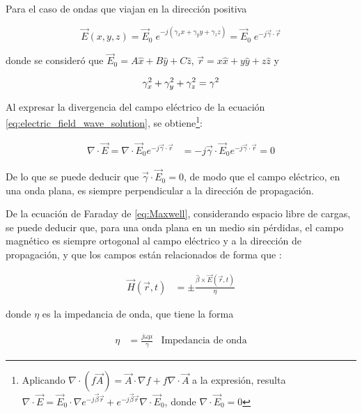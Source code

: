 Para el caso de ondas que viajan en la dirección positiva

\begin{equation}
	\label{eq:electric_field_wave_solution}
	\vec{E}(x,y,z) = \vec{E}_0 \;e^{-j(\gamma_x x + \gamma_y y + \gamma_z z)} = \vec{E}_0 \;e^{-j\vec{\gamma}\cdot\vec{r}}
\end{equation}

donde se consideró que $\vec{E}_0 = A \hat{x} + B \hat{y} + C \hat{z}$, $\vec{r} = x \hat{x} + y \hat{y} + z \hat{z}$ y

\begin{equation}
\label{eq:numero_de_onda}
\gamma_x^2 + \gamma_y^2 + \gamma_z^2 = \gamma^2 \\
\end{equation}


Al expresar la divergencia del campo eléctrico de la ecuación \ref{eq:electric_field_wave_solution}, se obtiene\footnote{Aplicando $\nabla \cdot (f \vec{A}) = \vec{A} \cdot \nabla f + f \nabla \cdot \vec{A}$ a la expresión, resulta $\nabla \cdot \vec{E} = \vec{E}_0 \cdot \nabla e^{-j \vec{\beta} \vec{r}} + e^{-j \vec{\beta} \vec{r}}\nabla \cdot \vec{E}_0$, donde $\nabla \cdot \vec{E}_0 =0$}:


\begin{align}
\nabla \cdot \vec{E} = \nabla \cdot \vec{E}_0 e^{-j\vec{\gamma} \cdot \vec{r}} & = -j \vec{\gamma} \cdot \vec{E}_0 e^{-j \vec{\gamma} \cdot \vec{r}} = 0
\end{align}

De lo que se puede deducir que $\vec{\gamma} \cdot \vec{E}_0 = 0$, de modo que el campo eléctrico, en una onda plana, es siempre perpendicular a la dirección de propagación.

De la ecuación de Faraday de \ref{eq:Maxwell}, considerando espacio libre de cargas, se puede deducir que, para una onda plana en un medio sin pérdidas, el campo magnético es siempre ortogonal al campo eléctrico y a la dirección de propagación, y que los campos están relacionados de forma que \cite{Fernandez:Electromag}:

\begin{align}
	\label{eq:relacion-e-h-ondaplana}
	\vec{H}(\vec{r},t) &= \pm \frac{\hat{\beta} \times \vec{E}(\vec{r},t)}{\eta}
\end{align}

donde $\eta$ es la impedancia de onda, que tiene la forma

\begin{align}
	\eta &= \frac{j \omega \mu}{\gamma }& \text{Impedancia de onda}
\end{align}


